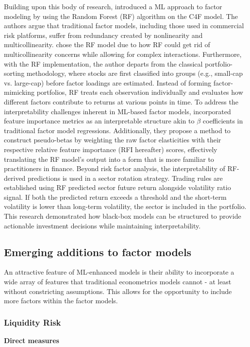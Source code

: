 Building upon this body of research,  introduced a ML approach to factor modeling by using the Random Forest (RF) algorithm on the C4F model. The authors argue that traditional factor models, including those used in commercial risk platforms, suffer from redundancy created by nonlinearity and multicollinearity.  chose the RF model due to how RF could get rid of multicollinearity concerns while allowing for complex interactions. Furthermore, with the RF implementation, the author departs from the classical portfolio-sorting methodology, where stocks are first classified into groups (e.g., small-cap vs. large-cap) before factor loadings are estimated. Instead of forming factor-mimicking portfolios, RF treats each observation individually and evaluates how different factors contribute to returns at various points in time. To address the interpretability challenges inherent in ML-based factor models,  incorporated feature importance metrics as an interpretable structure akin to $\beta$ coefficients in traditional factor model regressions. Additionally, they propose a method to construct pseudo-betas by weighting the raw factor elasticities with their respective relative feature importance (RFI hereafter) scores, effectively translating the RF model's output into a form that is more familiar to practitioners in finance. Beyond risk factor analysis, the interpretability of RF-derived predictions is used in a sector rotation strategy. Trading rules are established using RF predicted sector future return alongside volatility ratio signal. If both the predicted return exceeds a threshold and the short-term volatility is lower than long-term volatility, the sector is included in the portfolio. This research demonstrated how black-box models can be structured to provide actionable investment decisions while maintaining interpretability.

\subsection{Emerging additions to factor models}
An attractive feature of ML-enhanced models is their ability to incorporate a wide array of features that traditional econometrics models cannot - at least without constricting assumptions. This allows for the opportunity to include more factors within the factor models.
\subsubsection{Liquidity Risk}
\textbf{Direct measures}

